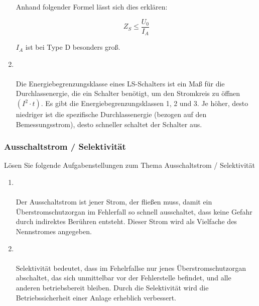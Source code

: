 \begin{enumerate}
            Anhand folgender Formel lässt sich dies erklären:

            $$Z_S \le \frac{U_0}{I_A}$$

            $I_A$ ist bei Type D besonders groß. 

    \item   {} \\\\
            Die Energiebegrenzungsklasse eines LS-Schalters ist ein Maß für die Durchlassenergie, die ein Schalter benötigt, um den Stromkreis zu öffnen $\left(I^2\cdot t\right)$.
            Es gibt die Energiebegrenzungsklassen 1, 2 und 3. Je höher, desto niedriger ist die spezifische Durchlassenergie (bezogen auf den Bemessungsstrom), desto schneller schaltet der Schalter aus.         
\end{enumerate}

\subsubsection{Ausschaltstrom / Selektivität}
Lösen Sie folgende Aufgabenstellungen zum Thema Ausschaltstrom / Selektivität

\begin{enumerate}
    \item   {} \\\\
            Der Ausschaltstrom ist jener Strom, der fließen muss, damit ein Überstromschutzorgan im Fehlerfall so schnell ausschaltet, dass keine Gefahr durch indirektes Berühren entsteht.
            Dieser Strom wird als Vielfache des Nennstromes angegeben.

    \item   {} \\\\
            Selektivität bedeutet, dass im Fehelrfallse nur jenes Überstromschutzorgan abschaltet, das sich unmittelbar vor der Fehlerstelle befindet, und alle anderen betriebsbereit bleiben.
            Durch die Selektivität wird die Betriebssicherheit einer Anlage erheblich verbessert.
\end{enumerate}